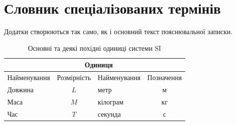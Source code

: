 ﻿%
\chapter[(Довідковий) Словник спеціалізованих термінів]{Словник спеціалізованих термінів}
\label{apdx:text}

Додатки створюються так само, як і основний текст пояснювальної записки.


\begin{table}[!ht]
\caption{\label{apdxtable:2}Основні та деякі похідні одиниці системи SI}
\begin{tabular}{|>{\raggedright\arraybackslash}p{5cm}|c|>{\raggedright\arraybackslash}p{4cm}|c|}
\hline
\multicolumn{2}{|c|}{Величина}&\multicolumn{2}{c|}{Одиниця}\\[0pt]\hline
Найменування & Розмірність & Найменування & Позначення \\[0pt]\hline\hline
Довжина & $L$ & метр & м \\[0pt]\hline
Маса & $M$ & кілограм & кг \\[0pt]\hline
Час & $T$ & секунда & с \\[0pt]\hline
\end{tabular}
\end{table}
